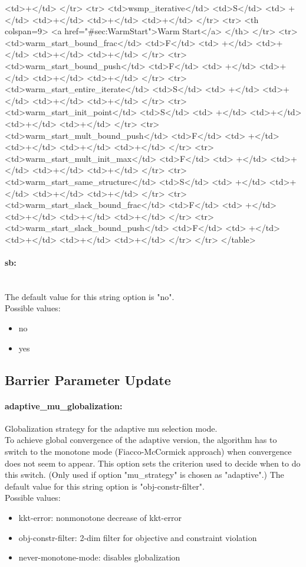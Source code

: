 {{<td>+</td>
</tr>
<tr>
<td>wsmp_iterative</td>
<td>S</td>
<td> +</td>
<td>+</td>
<td>+</td>
<td>+</td>
</tr>
<tr>   <th colspan=9> <a href="#sec:WarmStart">Warm Start</a> </th>
</tr>
<tr>
<td>warm_start_bound_frac</td>
<td>F</td>
<td> +</td>
<td>+</td>
<td>+</td>
<td>+</td>
</tr>
<tr>
<td>warm_start_bound_push</td>
<td>F</td>
<td> +</td>
<td>+</td>
<td>+</td>
<td>+</td>
</tr>
<tr>
<td>warm_start_entire_iterate</td>
<td>S</td>
<td> +</td>
<td>+</td>
<td>+</td>
<td>+</td>
</tr>
<tr>
<td>warm_start_init_point</td>
<td>S</td>
<td> +</td>
<td>+</td>
<td>+</td>
<td>+</td>
</tr>
<tr>
<td>warm_start_mult_bound_push</td>
<td>F</td>
<td> +</td>
<td>+</td>
<td>+</td>
<td>+</td>
</tr>
<tr>
<td>warm_start_mult_init_max</td>
<td>F</td>
<td> +</td>
<td>+</td>
<td>+</td>
<td>+</td>
</tr>
<tr>
<td>warm_start_same_structure</td>
<td>S</td>
<td> +</td>
<td>+</td>
<td>+</td>
<td>+</td>
</tr>
<tr>
<td>warm_start_slack_bound_frac</td>
<td>F</td>
<td> +</td>
<td>+</td>
<td>+</td>
<td>+</td>
</tr>
<tr>
<td>warm_start_slack_bound_push</td>
<td>F</td>
<td> +</td>
<td>+</td>
<td>+</td>
<td>+</td>
</tr>
</tr>
</table>
}
}
\paragraph{sb:}\label{opt:sb} ~ \\
 The default value for this string option is "no".
\\ 
Possible values:
\begin{itemize}
   \item no
   \item yes
\end{itemize}

\subsection{Barrier Parameter Update}
\label{sec:BarrierParameterUpdate}
\paragraph{adaptive\_mu\_globalization:}\label{opt:adaptive_mu_globalization} Globalization strategy for the adaptive mu selection mode. \\
 To achieve global convergence of the adaptive version, the algorithm has to switch to the monotone mode (Fiacco-McCormick approach) when convergence does not seem to appear.  This option sets the criterion used to decide when to do this switch. (Only used if option "mu\_strategy" is chosen as "adaptive".) The default value for this string option is "obj-constr-filter".
\\ 
Possible values:
\begin{itemize}
   \item kkt-error: nonmonotone decrease of kkt-error
   \item obj-constr-filter: 2-dim filter for objective and constraint violation
   \item never-monotone-mode: disables globalization
\end{itemize}

